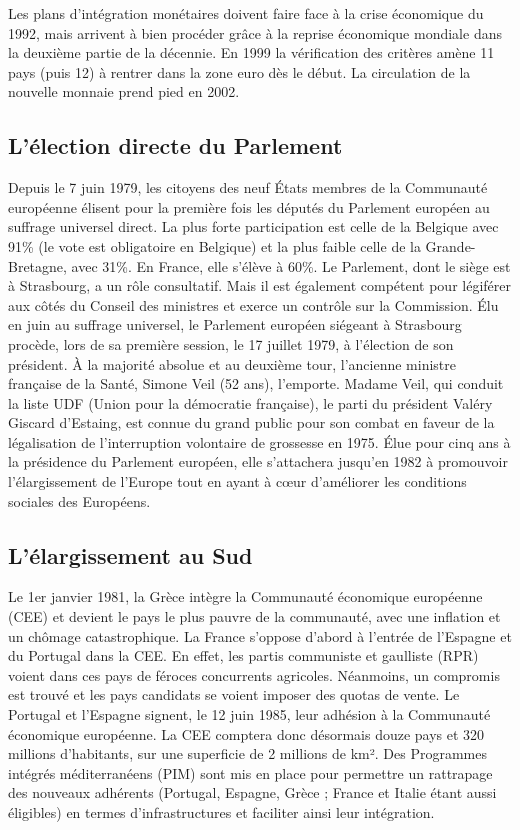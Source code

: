 \documentclass{report}%
\begin{document}
Les plans d’intégration monétaires doivent faire face à la crise économique du 1992, mais arrivent à bien procéder grâce à la reprise économique mondiale dans la deuxième partie de la décennie. En 1999 la vérification des critères amène 11 pays (puis 12) à rentrer dans la zone euro dès le début. La circulation de la nouvelle monnaie prend pied en 2002.
\subsection{L'élection directe du Parlement}
Depuis le 7 juin 1979, les citoyens des neuf États membres de la Communauté européenne élisent pour la première fois les députés du Parlement européen au suffrage universel direct. La plus forte participation est celle de la Belgique avec 91\% (le vote est obligatoire en Belgique) et la plus faible celle de la Grande-Bretagne, avec 31\%. En France, elle s'élève à 60\%. Le Parlement, dont le siège est à Strasbourg, a un rôle consultatif. Mais il est également compétent pour légiférer aux côtés du Conseil des ministres et exerce un contrôle sur la Commission. Élu en juin au suffrage universel, le Parlement européen siégeant à Strasbourg procède, lors de sa première session, le 17 juillet 1979, à l'élection de son président. À la majorité absolue et au deuxième tour, l'ancienne ministre française de la Santé, Simone Veil (52 ans), l'emporte. Madame Veil, qui conduit la liste UDF (Union pour la démocratie française), le parti du président Valéry Giscard d’Estaing, est connue du grand public pour son combat en faveur de la légalisation de l'interruption volontaire de grossesse en 1975. Élue pour cinq ans à la présidence du Parlement européen, elle s'attachera jusqu'en 1982 à promouvoir l'élargissement de l'Europe tout en ayant à cœur d'améliorer les conditions sociales des Européens.
\subsection{L'élargissement au Sud}
Le 1er janvier 1981, la Grèce intègre la Communauté économique européenne (CEE) et devient le pays le plus pauvre de la communauté, avec une inflation et un chômage catastrophique.
La France s'oppose d'abord à l'entrée de l'Espagne et du Portugal dans la CEE. En effet, les partis communiste et gaulliste (RPR) voient dans ces pays de féroces concurrents agricoles. Néanmoins, un compromis est trouvé et les pays candidats se voient imposer des quotas de vente. Le Portugal et l'Espagne signent, le 12 juin 1985, leur adhésion à la Communauté économique européenne. La CEE comptera donc désormais douze pays et 320 millions d'habitants, sur une superficie de 2 millions de km². Des Programmes intégrés méditerranéens (PIM) sont mis en place pour permettre un rattrapage des nouveaux adhérents (Portugal, Espagne, Grèce ; France et Italie étant aussi éligibles) en termes d'infrastructures et faciliter ainsi leur intégration.
\end{document}
